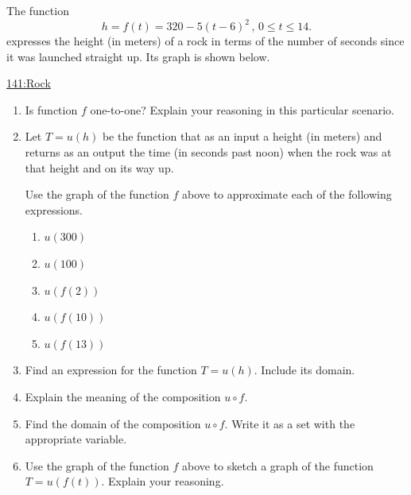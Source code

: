 \documentclass{ximera}
\begin{document}
\begin{question}\label{Qpfef3z}
The function
\[
  h = f(t) = 320 - 5(t-6)^2 \, , \, 0\leq t \leq 14.
\]
expresses the height (in meters) of a rock in terms of the number of seconds since it was launched straight up. Its graph is shown below.

 
\begin{onlineOnly}
    \begin{center}
\end{center}
\end{onlineOnly}

\href{https://www.desmos.com/calculator/ew9jsipj5z}{141:Rock}

\begin{enumerate}
\item Is function $f$ one-to-one? Explain your reasoning in this particular scenario.

\item Let  $T=u(h)$ be the function that as an input a height (in meters) and returns as an output the time (in seconds past noon) when the rock was at that height and on its way up. 

Use the graph of the function $f$ above to approximate each of the following expressions.

\begin{enumerate}
\item $u(300)$

\item $u(100)$

\item $u(f(2))$

\item $u(f(10))$

\item $u(f(13))$
\end{enumerate}

\item Find an expression for the function $T=u(h)$. Include its domain.

\item Explain the meaning of the composition $u\circ f$.

\item Find the domain of the composition $u\circ f$. Write it as a set with the appropriate variable.

\item Use the graph of the function $f$ above to sketch a graph of the function $T= u(f(t))$. Explain your reasoning.


\end{enumerate}
\end{question}
\end{document}
